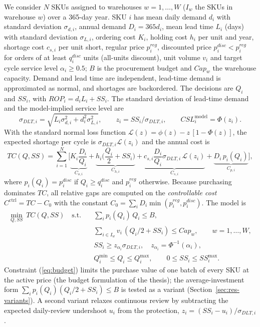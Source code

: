 \documentclass[preprint,12pt,authoryear]{elsarticle}
\newcommand{\sdlt}{\sigma_{DLT,i}}
\newcommand{\Cctrl}{C^{\mathrm{ctrl}}}
\begin{document}
We consider $N$ SKUs assigned to warehouses $w=1,\dots,W$ ($I_w$ the SKUs in warehouse $w$) over a 365-day year. SKU $i$ has mean daily demand $d_i$ with standard deviation $\sigma_{d,i}$, annual demand $D_i=365d_i$, mean lead time $L_i$ (days) with standard deviation $\sigma_{L,i}$, ordering cost $K_i$, holding cost $h_i$ per unit and year, shortage cost $c_{s,i}$ per unit short, regular price $p^{reg}_i$, discounted price $p^{disc}_i<p^{reg}_i$ for orders of at least $q^{disc}_i$ units (all-units discount), unit volume $v_i$ and target cycle service level $\alpha_i\ge0.5$; $B$ is the procurement budget and $Cap_w$ the warehouse capacity. Demand and lead time are independent, lead-time demand is approximated as normal, and shortages are backordered. The decisions are $Q_i$ and $SS_i$, with $ROP_i=d_iL_i+SS_i$. The standard deviation of lead-time demand and the model-implied service level are
\begin{equation}\label{eq:sdlt}
\sdlt=\sqrt{L_i\sigma_{d,i}^2+d_i^2\sigma_{L,i}^2},\qquad z_i=SS_i/\sdlt,\qquad CSL^{\mathrm{model}}_i=\Phi(z_i).
\end{equation}
With the standard normal loss function $\mathcal{L}(z)=\phi(z)-z\,[1-\Phi(z)]$, the expected shortage per cycle is $\sdlt\mathcal{L}(z_i)$ and the annual cost is
\begin{equation}\label{eq:tc}
TC(Q,SS)=\sum_{i=1}^N\Big[\underbrace{K_i\frac{D_i}{Q_i}}_{C_{o,i}}+\underbrace{h_i\Big(\frac{Q_i}{2}+SS_i\Big)}_{C_{h,i}}+\underbrace{c_{s,i}\frac{D_i}{Q_i}\sdlt\,\mathcal{L}(z_i)}_{C_{s,i}}+\underbrace{D_i\,p_i(Q_i)}_{C_{p,i}}\Big],
\end{equation}
where $p_i(Q_i)=p^{disc}_i$ if $Q_i\ge q^{disc}_i$ and $p^{reg}_i$ otherwise. Because purchasing dominates $TC$, all relative gaps are computed on the \emph{controllable cost} $\Cctrl=TC-C_0$ with the constant $C_0=\sum_i D_i\min(p^{reg}_i,p^{disc}_i)$. The model is
\begin{align}
\min_{Q,SS}\ TC(Q,SS)\quad\text{s.t.}\quad & \textstyle\sum_{i} p_i(Q_i)\,Q_i \le B, \label{eq:budget}\\
& \textstyle\sum_{i\in I_w} v_i\,(Q_i/2+SS_i)\le Cap_w,\qquad w=1,\dots,W, \label{eq:wh}\\
& SS_i\ge z_{\alpha_i}\sdlt,\quad z_{\alpha_i}=\Phi^{-1}(\alpha_i), \label{eq:service}\\
& Q^{\min}_i\le Q_i\le Q^{\max}_i,\qquad 0\le SS_i\le SS^{\max}_i. \label{eq:bounds}
\end{align}
Constraint (\ref{eq:budget}) limits the purchase value of one batch of every SKU at the active price (the budget formulation of the thesis); the average-investment form $\sum_i p_i(Q_i)(Q_i/2+SS_i)\le B$ is tested as a variant (Section~\ref{sec:res-variants}). A second variant relaxes continuous review by subtracting the expected daily-review undershoot $u_i$ from the protection, $z_i=(SS_i-u_i)/\sdlt$.
\end{document}
